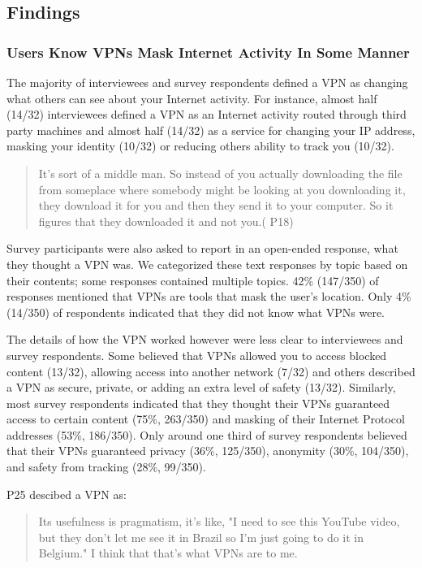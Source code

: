 \subsection{Findings}\label{sec:results}

\subsubsection{Users Know VPNs Mask Internet Activity In Some Manner}

The majority of interviewees and survey respondents defined a VPN as changing what others can see about your Internet activity. For instance, almost half (14/32) interviewees defined a VPN as an
Internet activity routed through third party machines and almost half (14/32) as a service for changing your IP
address, masking your identity (10/32) or reducing others ability to track
you (10/32).  \begin{quote}It's sort of a middle man. So instead of you actually
downloading the file from someplace where somebody might be looking at you
downloading it, they download it for you and then they send it to your
computer. So it figures that they downloaded it and not you.( P18)\end{quote}

Survey participants were also asked to report in an open-ended response, what they
thought a VPN was. We categorized these text responses by topic based on their
contents; some responses contained multiple topics.  42\% (147/350) of
responses mentioned that VPNs are tools that mask the user’s location. Only
4\% (14/350) of respondents indicated that they did not know what VPNs were.

The details of how the VPN worked however were less clear to interviewees and survey respondents. Some believed that VPNs allowed you to  access blocked content (13/32), allowing access into another network (7/32) and others described a VPN as secure,  private, or adding an extra level of safety (13/32). Similarly, most survey respondents indicated that they thought their VPNs guaranteed access to certain content
 (75\%, 263/350) and masking of their Internet Protocol addresses (53\%, 186/350).
Only around one third of survey respondents believed that their VPNs guaranteed privacy (36\%,
125/350), anonymity (30\%, 104/350), and safety from tracking (28\%, 99/350).

P25 descibed a VPN as:
\begin{quote} Its usefulness is pragmatism, it's like, "I need to see this YouTube video, but they don't let me see it in Brazil so I'm just going to do it
    in Belgium." I think that that's what VPNs are to me. \end{quote}
    

